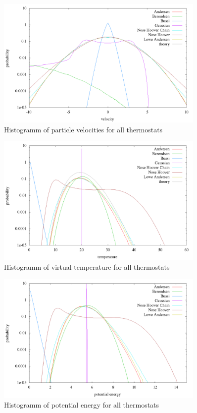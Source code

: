 \begin{figure}[H]
\centering
\includegraphics[width=0.9\textwidth]{./graphics/Histogramm_velocity_one_T=20_p=64.png}
\caption{Histogramm of particle velocities for all thermostats}
\label{im:vel_one}
\end{figure}

\begin{figure}[H]
\centering
\includegraphics[width=0.9\textwidth]{./graphics/Histogramm_tempCol_one_T=20_p=64.png}
\caption{Histogramm of virtual temperature for all thermostats}
\label{im:temp_one}
\end{figure}

\begin{figure}[H]
\centering
\includegraphics[width=0.9\textwidth]{./graphics/Histogramm_epot_one_T=20_p=64.png}
\caption{Histogramm of potential energy for all thermostats}
\label{im:epot_one}
\end{figure}

